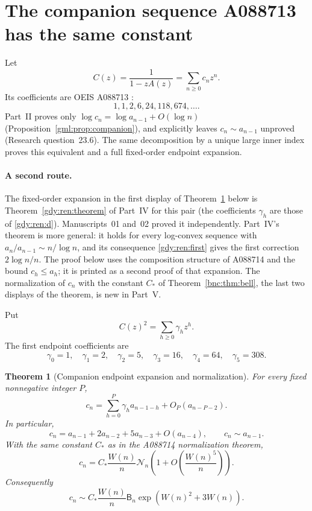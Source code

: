 \documentclass[11pt]{article}
\numberwithin{equation}{section}
\newtheorem{theorem}{Theorem}[section]
\theoremstyle{definition}
\theoremstyle{remark}
\begin{document}
\section{The companion sequence A088713 has the same constant}\label{bnc:sec:companion}

Let
\[
 C(z)=\frac1{1-zA(z)}=\sum_{n\ge0}c_nz^n.
\]
Its coefficients are OEIS A088713 \cite{oeisC}:
\[
 1,1,2,6,24,118,674,\ldots.
\]
Part~II proves only
\(\log c_n=\log a_{n-1}+O(\log n)\) (Proposition~\ref{gml:prop:companion}),
and explicitly leaves \(c_n\sim a_{n-1}\) unproved (Research
question~23.6).
The same decomposition by a unique large inner index proves this
equivalent and a full fixed-order endpoint expansion.

\paragraph{A second route.}
The fixed-order expansion in the first display of
Theorem~\ref{bnc:thm:companion} below is Theorem~\ref{gdy:ren:theorem} of
Part~IV for this pair (the coefficients \(\gamma_h\) are those of
\eqref{gdy:ren:d}). Manuscripts~01 and~02 proved it independently. Part~IV's
theorem is more general: it holds for every log-convex sequence with
\(a_n/a_{n-1}\sim n/\log n\), and its consequence \eqref{gdy:ren:first}
gives the first correction \(2\log n/n\). The proof below uses the
composition structure of A088714 and the bound \(c_h\le a_h\); it is
printed as a second proof of that expansion. The normalization of \(c_n\)
with the constant \(C_*\) of Theorem~\ref{bnc:thm:bell}, the last two
displays of the theorem, is new in Part~V.

Put
\[
 C(z)^2=\sum_{h\ge0}\gamma_hz^h.
\]
The first endpoint coefficients are
\[
 \gamma_0=1,\quad \gamma_1=2,\quad \gamma_2=5,\quad \gamma_3=16,\quad
 \gamma_4=64,\quad \gamma_5=308.
\]

\begin{theorem}[Companion endpoint expansion and normalization]\label{bnc:thm:companion}
For every fixed nonnegative integer \(P\),
\[
 \boxed{
 c_n=\sum_{h=0}^{P}\gamma_h a_{n-1-h}
           +O_P(a_{n-P-2}).}
\]
In particular,
\[
 c_n=a_{n-1}+2a_{n-2}+5a_{n-3}+O(a_{n-4}),
 \qquad c_n\sim a_{n-1}.
\]
With the same constant \(C_*\) as in the A088714 normalization theorem,
\[
 \boxed{
 c_n=C_*\frac{W(n)}{n}\mathcal N_n
        \left(1+O\!\left(\frac{W(n)^5}{n}\right)\right).}
\]
Consequently
\[
 c_n\sim C_*\frac{W(n)}{n}
              \mathsf B_n\exp(W(n)^2+3W(n)).
\]
\end{theorem}
\end{document}

